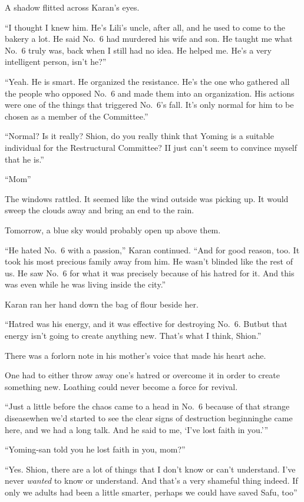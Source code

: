 A shadow flitted across Karan's eyes.

``I thought I knew him. He's Lili's uncle, after all, and he used to
come to the bakery a lot. He said No.~6 had murdered his wife and son.
He taught me what No.~6 truly was, back when I still had no idea. He
helped me. He's a very intelligent person, isn't he?''

``Yeah. He is smart. He organized the resistance. He's the one who
gathered all the people who opposed No.~6 and made them into an
organization. His actions were one of the things that triggered No.~6's
fall. It's only normal for him to be chosen as a member of the
Committee.''

``Normal? Is it really? Shion, do you really think that Yoming is a
suitable individual for the Restructural Committee? I\el I just can't
seem to convince myself that he is.''

``Mom\el ''

The windows rattled. It seemed like the wind outside was picking up. It
would sweep the clouds away and bring an end to the rain.

Tomorrow, a blue sky would probably open up above them.

``He hated No.~6 with a passion,'' Karan continued. ``And for good
reason, too. It took his most precious family away from him. He wasn't
blinded like the rest of us. He saw No.~6 for what it was precisely
because of his hatred for it. And this was even while he was living
inside the city.''

Karan ran her hand down the bag of flour beside her.

``Hatred was his energy, and it was effective for destroying No.~6.
But\el but that energy isn't going to create anything new. That's what I
think, Shion.''

There was a forlorn note in his mother's voice that made his heart ache.

One had to either throw away one's hatred or overcome it in order to
create something new. Loathing could never become a force for revival.

``Just a little before the chaos came to a head in No.~6 because of that
strange disease\el when we'd started to see the clear signs of
destruction beginning\el he came here, and we had a long talk. And he
said to me, `I've lost faith in you.'''

``Yoming-san told you he lost faith in you, mom?''

``Yes. Shion, there are a lot of things that I don't know or can't
understand. I've never \emph{wanted} to know or understand. And that's a very
shameful thing indeed. If only we adults had been a little smarter,
perhaps we could have saved Safu, too\el ''

